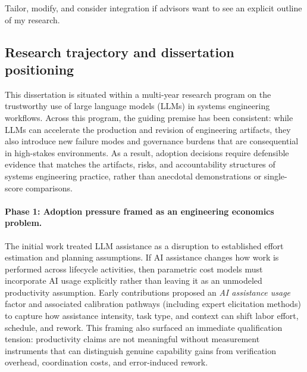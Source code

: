 

Tailor, modify, and consider integration if advisors want to see an explicit outline of my research.

\subsection{Research trajectory and dissertation positioning}
\label{subsec:research_trajectory}

This dissertation is situated within a multi-year research program on the trustworthy use of large language models (LLMs) in systems engineering workflows. Across this program, the guiding premise has been consistent: while LLMs can accelerate the production and revision of engineering artifacts, they also introduce new failure modes and governance burdens that are consequential in high-stakes environments. As a result, adoption decisions require defensible evidence that matches the artifacts, risks, and accountability structures of systems engineering practice, rather than anecdotal demonstrations or single-score comparisons.

\paragraph{Phase 1: Adoption pressure framed as an engineering economics problem.}
The initial work treated LLM assistance as a disruption to established effort estimation and planning assumptions. If AI assistance changes how work is performed across lifecycle activities, then parametric cost models must incorporate AI usage explicitly rather than leaving it as an unmodeled productivity assumption. Early contributions proposed an \emph{AI assistance usage} factor and associated calibration pathways (including expert elicitation methods) to capture how assistance intensity, task type, and context can shift labor effort, schedule, and rework. This framing also surfaced an immediate qualification tension: productivity claims are not meaningful without measurement instruments that can distinguish genuine capability gains from verification overhead, coordination costs, and error-induced rework.

